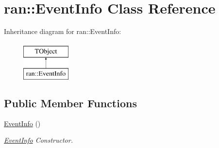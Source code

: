 \hypertarget{classran_1_1EventInfo}{\section{ran\-:\-:Event\-Info Class Reference}
\label{classran_1_1EventInfo}
}
Inheritance diagram for ran\-:\-:Event\-Info\-:\begin{figure}[H]
\begin{center}
\leavevmode
\includegraphics[height=2.000000cm]{classran_1_1EventInfo}
\end{center}
\end{figure}
\subsection*{Public Member Functions}
\begin{DoxyCompactItemize}
\item 
\hypertarget{classran_1_1EventInfo_a1713048bd2b1cd5cc12ec4200ecb668a}{\hyperlink{classran_1_1EventInfo_a1713048bd2b1cd5cc12ec4200ecb668a}{Event\-Info} ()}\label{classran_1_1EventInfo_a1713048bd2b1cd5cc12ec4200ecb668a}

\begin{DoxyCompactList}\small\item\em \hyperlink{classran_1_1EventInfo}{Event\-Info} Constructor. \end{DoxyCompactList}\end{DoxyCompactItemize}
